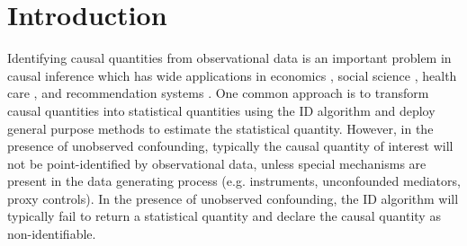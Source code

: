 \documentclass[12pt]{article}
\theoremstyle{plain}
\theoremstyle{definition}
\theoremstyle{remark}
\begin{document}
\section{Introduction}
Identifying causal quantities from observational data is an important problem in causal inference which has wide applications in economics \cite{angrist1995identification}, social science \cite{freedman2010statistical}, health care \cite{lotfollahi2021compositional,frauen2023estimating}, and recommendation systems \cite{bottou2013counterfactual}. One common approach is to transform causal quantities into statistical quantities using the ID algorithm \cite{tianTestableImplicationsCausal2002} and deploy general purpose methods to estimate the statistical quantity. However, in the presence of unobserved confounding, typically the causal quantity of interest will not be point-identified by observational data, unless special mechanisms are present in the data generating process (e.g. instruments, unconfounded mediators, proxy controls). In the presence of unobserved confounding, the ID algorithm will typically fail to return a statistical quantity and declare the causal quantity as non-identifiable. 

\end{document}
